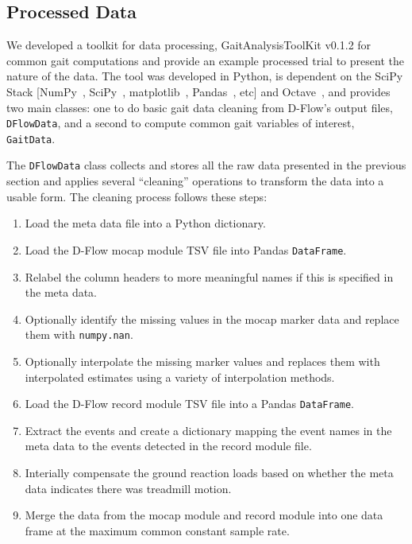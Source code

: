 \documentclass[fleqn,12pt]{wlpeerj}
\begin{document}
\subsection*{Processed Data}
%
We developed a toolkit for data processing, GaitAnalysisToolKit v0.1.2
\citep{Moore2014a} for common gait computations and provide an example
processed trial to present the nature of the data. The tool was developed in
Python, is dependent on the SciPy Stack [NumPy~\citep{Walt2011},
SciPy~\citep{Jones2001}, matplotlib~\citep{Hunter2007},
Pandas~\citep{McKinney2010}, etc] and Octave~\citep{Octave2014}, and provides
two main classes: one to do basic gait data cleaning from D-Flow's output
files, \verb|DFlowData|, and a second to compute common gait variables of
interest, \verb|GaitData|.

The \verb|DFlowData| class collects and stores all the raw data presented in
the previous section and applies several ``cleaning'' operations to transform
the data into a usable form. The cleaning process follows these steps:
%
\begin{enumerate}
  \item Load the meta data file into a Python dictionary.
  \item Load the D-Flow mocap module TSV file into Pandas \verb|DataFrame|.
  \item Relabel the column headers to more meaningful names if this is
    specified in the meta data.
  \item Optionally identify the missing values in the mocap marker data and
    replace them with \verb|numpy.nan|.
  \item Optionally interpolate the missing marker values and replaces them
    with interpolated estimates using a variety of interpolation methods.
  \item Load the D-Flow record module TSV file into a Pandas \verb|DataFrame|.
  \item Extract the events and create a dictionary mapping the event names in
    the meta data to the events detected in the record module file.
  \item Interially compensate the ground reaction loads based on whether the
    meta data indicates there was treadmill motion.
  \item Merge the data from the mocap module and record module into one data
    frame at the maximum common constant sample rate.
\end{enumerate}
\end{document}
